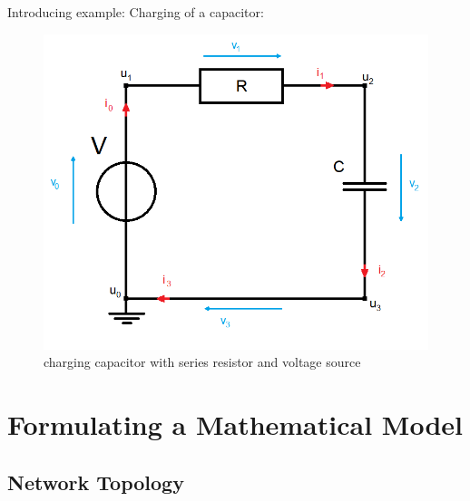 






	\begin{frame}
		Introducing example: Charging of a capacitor:\\
		\begin{figure}[H]
			\centering
			\includegraphics[scale=0.4]{../Tex/pictures/Example1_simple.png}
			\caption{charging capacitor with series resistor and voltage source}
			\label{circuit:charging of capacitor}
		\end{figure}
	\end{frame}

\section*{Formulating a Mathematical Model}

	\subsection{Network Topology}
		
